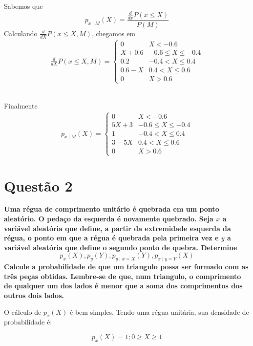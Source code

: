 \documentclass[a5paper]{report}
\begin{document}
Sabemos que
\[p_{x \mid M}(X) = \frac{\frac{d}{dx}P(x \leq X)}{P(M)}\]
Calculando $\frac{d}{dX}P(x \leq X, M)$, chegamos em
\begin{align*}
    \frac{d}{dX}P(x \leq X, M) =
    \begin{cases}
        0 & X < -0.6\\
        X + 0.6 & -0.6 \leq X \leq -0.4\\
        0.2 & -0.4 < X \leq 0.4\\
        0.6 - X & 0.4 < X \leq 0.6\\
        0 & X > 0.6
    \end{cases}
\end{align*}\

Finalmente
\begin{align*}
    \boxed{
    p_{x \mid M}(X) =
    \begin{cases}
        0 & X < -0.6\\
        5X + 3 & -0.6 \leq X \leq -0.4\\
        1 & -0.4 < X \leq 0.4\\
        3 - 5X & 0.4 < X \leq 0.6\\
        0 & X > 0.6
    \end{cases}
    }
\end{align*}

\section*{Questão 2}
\textbf{Uma régua de comprimento unitário é quebrada em um ponto\\ aleatório. O pedaço da esquerda é novamente quebrado. Seja $x$ a variável aleatória que define, a partir da extremidade esquerda da régua, o ponto em que a régua é quebrada pela primeira vez e $y$ a variável aleatória que define o segundo ponto de quebra. Determine}
\[p_x(X), p_y(Y), p_{y \mid x = X}(Y), p_{x \mid y = Y}(X)\]
\textbf{Calcule a probabilidade de que um triangulo possa ser formado com as três peças obtidas. Lembre-se de que, num triangulo, o comprimento de qualquer um dos lados é menor que a soma dos comprimentos dos outros dois lados.}

O cálculo de $p_x(X)$ é bem simples. Tendo uma régua unitária, sua densidade de probabilidade é:
\begin{center}
\end{center}
\[p_x(X) = 1; 0 \geq X \geq 1\]
\end{document}
